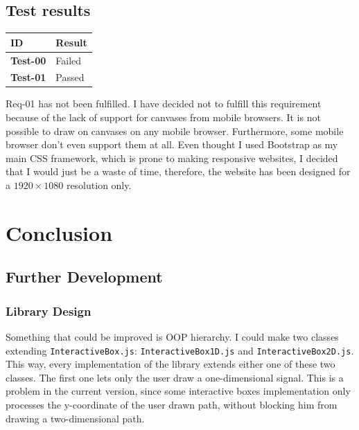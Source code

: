 \documentclass{article}
\begin{document}

\subsection{Test results}

\bgroup{}
\def\arraystretch{1.25}
\begin{center}
    \begin{tabular}{ |l|l| }
        \hline
        \textbf{ID} & Result \\
        \hline
        \textbf{Test-00} & \color{red} Failed \\
        \hline
        \textbf{Test-01} & \color{darkgreen} Passed \\
        \hline
    \end{tabular}
\end{center}
\egroup{}

Req-01 has not been fulfilled. I have decided not to fulfill this requirement because of the lack
of support for canvases from mobile browsers. It is not possible to draw on canvases on any mobile
browser. Furthermore, some mobile browser don't even support them at all.
Even thought I used Bootstrap as my main CSS framework, which is prone to making responsive websites,
I decided that I would just be a waste of time, therefore, the website has been designed for a \(1920\times1080\) resolution only.

\pagebreak

\section{Conclusion}

\subsection{Further Development}

\subsubsection{Library Design}

Something that could be improved is OOP hierarchy. I could make
two classes extending \texttt{InteractiveBox.js}: \texttt{InteractiveBox1D.js} and
\texttt{InteractiveBox2D.js}. This way, every implementation of the library extends either
one of these two classes. The first one lets only the user draw a one-dimensional signal.
This is a problem in the current version, since some interactive boxes implementation only processes
the y-coordinate of the user drawn path, without blocking him from drawing a two-dimensional path.
\end{document}
